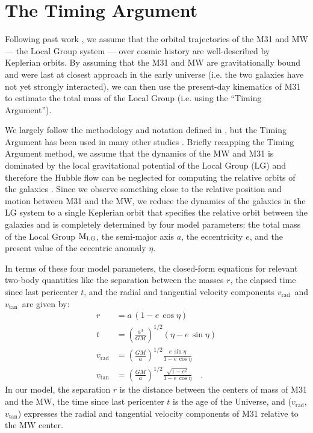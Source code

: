 \documentclass[twocolumn]{aastex631}
\newcommand{\mlg}{\ensuremath{\textrm{M}_{\rm LG}}}
\newcommand{\vtan}{\ensuremath{v_\textrm{tan}}}
\newcommand{\vrad}{\ensuremath{v_\textrm{rad}}}
\begin{document}
\section{The Timing Argument}
\label{sec:timingarg}

Following past work \citep[e.g.,][]{Lynden-Bell:1981, vdm2012, Penarrubia2016},
we assume that the orbital trajectories of the M31 and MW --- the Local Group
system --- over cosmic history are well-described by Keplerian orbits.
By assuming that the M31 and MW are gravitationally bound and were last at
closest approach in the early universe (i.e. the two galaxies have not yet
strongly interacted), we can then use the present-day kinematics of M31 to
estimate the total mass of the Local Group (i.e. using the ``Timing Argument'').

We largely follow the methodology and notation defined in
\citet{Penarrubia2016}, but the Timing Argument has been used in many other
studies \citep[e.g.,][]{stuff}.
Briefly recapping the Timing Argument method, we assume that the dynamics of the
MW and M31 is dominated by the local gravitational potential of the Local Group
(LG) and therefore the Hubble flow can be neglected for computing the relative
orbits of the galaxies \citep[see, e.g.,][]{someone}.
Since we observe something close to the relative position and motion between M31
and the MW, we reduce the dynamics of the galaxies in the LG system to a single
Keplerian orbit that specifies the relative orbit between the galaxies and is
completely determined by four model parameters: the total mass of the Local
Group \mlg, the semi-major axis $a$, the eccentricity $e$, and the present value
of the eccentric anomaly $\eta$.

In terms of these four model parameters, the closed-form equations for relevant
two-body quantities like the separation between the masses $r$, the elapsed time
since last pericenter $t$, and the radial and tangential velocity components
\vrad\ and \vtan\ are given by:
\begin{align}
  r &= a \, (1-e\,\cos\eta) \label{eq:r} \\
  t &= \left( \frac{a^3}{GM} \right)^{1/2}(\eta-e\,\sin\eta) \label{eq:t} \\
  \vrad &= \left( \frac{GM}{a} \right)^{1/2} \frac{e\,\sin\eta}{1-e\,\cos\eta} \label{eq:vrad} \\
  \vtan &= \left( \frac{GM}{a} \right)^{1/2} \frac{\sqrt{1-e^2}}{1-e\,\cos\eta} \label{eq:vtan} \quad .
\end{align}
In our model, the separation $r$ is the distance between the centers of mass of
M31 and the MW, the time since last pericenter $t$ is the age of the Universe,
and (\vrad, \vtan) expresses the radial and tangential velocity components of
M31 relative to the MW center.
\end{document}
